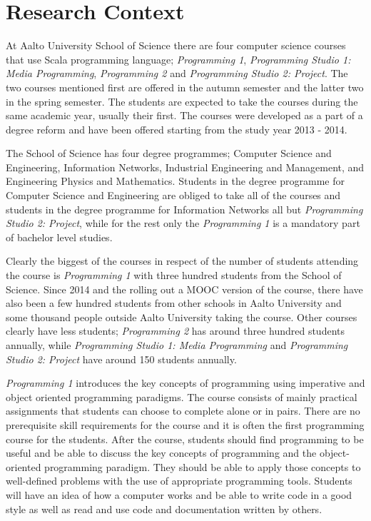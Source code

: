 \chapter{Research Context}
\label{chapter:context}

At Aalto University School of Science there are four computer science courses that use Scala programming language; \emph{Programming 1}, \emph{Programming Studio 1: Media Programming}, \emph{Programming 2} and \emph{Programming Studio 2: Project}. The two courses mentioned first are offered in the autumn semester and the latter two in the spring semester. The students are expected to take the courses during the same academic year, usually their first. The courses were developed as a part of a degree reform and have been offered starting from the study year 2013 - 2014.

The School of Science has four degree programmes; Computer Science and Engineering, Information Networks, Industrial Engineering and Management, and Engineering Physics and Mathematics. Students in the degree programme for Computer Science and Engineering are obliged to take all of the courses and students in the degree programme for Information Networks all but \emph{Programming Studio 2: Project}, while for the rest only the \emph{Programming 1} is a mandatory part of bachelor level studies.

Clearly the biggest of the courses in respect of the number of students attending the course is \emph{Programming 1} with three hundred students from the School of Science. Since 2014 and the rolling out a MOOC version of the course, there have also been a few hundred students from other schools in Aalto University and some thousand people outside Aalto University taking the course. Other courses clearly have less students; \emph{Programming 2} has around three hundred students annually, while \emph{Programming Studio 1: Media Programming} and \emph{Programming Studio 2: Project} have around 150 students annually.

\emph{Programming 1} introduces the key concepts of programming using imperative and object oriented programming paradigms. The course consists of mainly practical assignments that students can choose to complete alone or in pairs. There are no prerequisite skill requirements for the course and it is often the first programming course for the students. After the course, students should find programming to be useful and be able to discuss the key concepts of programming and the object-oriented programming paradigm. They should be able to apply those concepts to well-defined problems with the use of appropriate programming tools. Students will have an idea of how a computer works and be able to write code in a good style as well as read and use code and documentation written by others.

